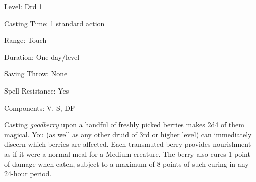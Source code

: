 
\begin{description*}
\item[Level:] Drd 1
\item[Casting Time:] 1 standard action
\item[Range:] Touch
\item[Duration:] One day/level
\item[Saving Throw:] None
\item[Spell Resistance:] Yes
\item[Components:] V, S, DF
\end{description*}

Casting \textit{goodberry} upon a handful of freshly picked berries makes 2d4 of
them magical. You (as well as any other druid of 3rd or higher level) can immediately
discern which berries are affected. Each transmuted berry provides nourishment
as if it were a normal meal for a Medium creature. The berry also cures 1 point
of damage when eaten, subject to a maximum of 8 points of such curing in any 24-hour
period.